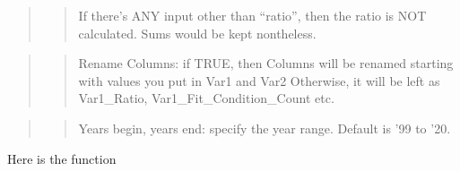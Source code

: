 \documentclass[
]{article}
\begin{document}
\begin{quote}
\begin{quote}
If there's ANY input other than ``ratio'', then the ratio is NOT
calculated. Sums would be kept nontheless.
\end{quote}
\end{quote}

\begin{quote}
\begin{quote}
Rename Columns: if TRUE, then Columns will be renamed starting with
values you put in Var1 and Var2 Otherwise, it will be left as
Var1\_Ratio, Var1\_Fit\_Condition\_Count etc.
\end{quote}
\end{quote}

\begin{quote}
\begin{quote}
Years begin, years end: specify the year range. Default is '99 to '20.
\end{quote}
\end{quote}

Here is the function
\end{document}
